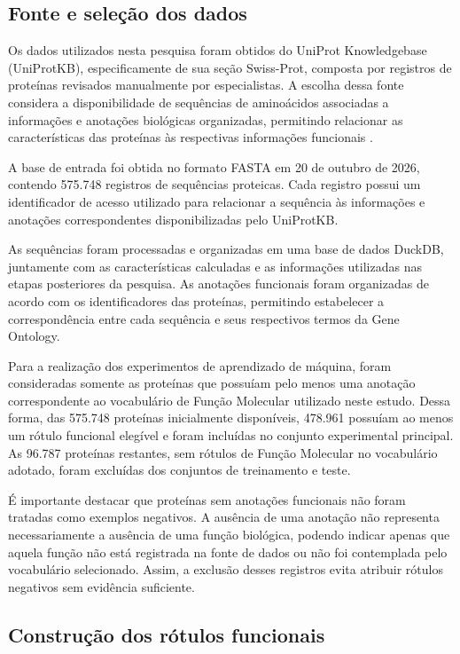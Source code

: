 \subsection{Fonte e seleção dos dados}
\label{subsec:fonte_dados}

Os dados utilizados nesta pesquisa foram obtidos do UniProt Knowledgebase (UniProtKB), especificamente de sua seção Swiss-Prot, composta por registros de proteínas revisados manualmente por especialistas. A escolha dessa fonte considera a disponibilidade de sequências de aminoácidos associadas a informações e anotações biológicas organizadas, permitindo relacionar as características das proteínas às respectivas informações funcionais \cite{uniprot2025}.

A base de entrada foi obtida no formato FASTA em 20 de outubro de 2026, contendo 575.748 registros de sequências proteicas. Cada registro possui um identificador de acesso utilizado para relacionar a sequência às informações e anotações correspondentes disponibilizadas pelo UniProtKB.

As sequências foram processadas e organizadas em uma base de dados DuckDB, juntamente com as características calculadas e as informações utilizadas nas etapas posteriores da pesquisa. As anotações funcionais foram organizadas de acordo com os identificadores das proteínas, permitindo estabelecer a correspondência entre cada sequência e seus respectivos termos da Gene Ontology.

Para a realização dos experimentos de aprendizado de máquina, foram consideradas somente as proteínas que possuíam pelo menos uma anotação correspondente ao vocabulário de Função Molecular utilizado neste estudo. Dessa forma, das 575.748 proteínas inicialmente disponíveis, 478.961 possuíam ao menos um rótulo funcional elegível e foram incluídas no conjunto experimental principal. As 96.787 proteínas restantes, sem rótulos de Função Molecular no vocabulário adotado, foram excluídas dos conjuntos de treinamento e teste.

É importante destacar que proteínas sem anotações funcionais não foram tratadas como exemplos negativos. A ausência de uma anotação não representa necessariamente a ausência de uma função biológica, podendo indicar apenas que aquela função não está registrada na fonte de dados ou não foi contemplada pelo vocabulário selecionado. Assim, a exclusão desses registros evita atribuir rótulos negativos sem evidência suficiente.


\subsection{Construção dos rótulos funcionais}
\label{subsec:rotulos_funcionais}

